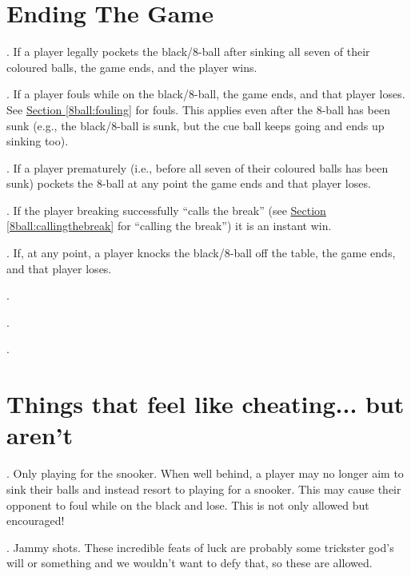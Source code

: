 \section{Ending The Game} \label{8ball:ending}
\ex. If a player legally pockets the black/8-ball after sinking all seven of their coloured balls, the game ends, and the player wins.\par
\ex. If a player fouls while on the black/8-ball, the game ends, and that player loses. See \hyperref[8ball:fouling]{Section \ref*{8ball:fouling}} for fouls. This applies even after the 8-ball has been sunk (e.g., the black/8-ball is sunk, but the cue ball keeps going and ends up sinking too).\par
\ex. If a player prematurely (i.e., before all seven of their coloured balls has been sunk) pockets the 8-ball at any point the game ends and that player loses.\par
\ex. If the player breaking successfully “calls the break” (see \hyperref[8ball:callingthebreak]{Section \ref*{8ball:callingthebreak}} for “calling the break”) it is an instant win.\par
\ex. If, at any point, a player knocks the black/8-ball off the table, the game ends, and that player loses.\par
\ex. \IntentionalFoulLoss[8ball]\par
\ex. \MisleadingOpponentLoss[8ball]\par
\ex. \PoorBehaviorLoss[8ball]\par

\section{Things that feel like cheating... but aren't} \label{8ball:notcheating}  %
\ex. Only playing for the snooker. When well behind, a player may no longer aim to sink their balls and instead resort to playing for a snooker. This may cause their opponent to foul while on the black and lose. This is not only allowed but encouraged!\par
\ex. Jammy shots. These incredible feats of luck are probably some trickster god's will or something and we wouldn't want to defy that, so these are allowed.\par

